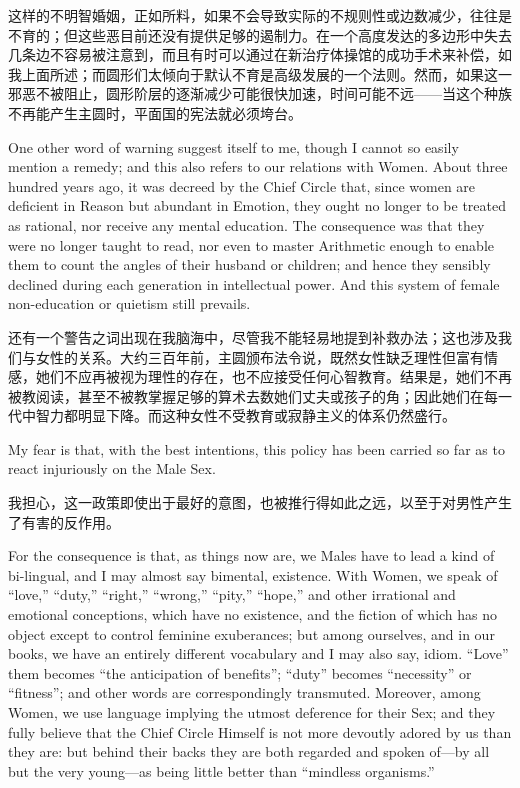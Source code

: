 \documentclass[12pt,UTF8]{ctexbook}
\begin{document}
这样的不明智婚姻，正如所料，如果不会导致实际的不规则性或边数减少，往往是不育的；但这些恶目前还没有提供足够的遏制力。在一个高度发达的多边形中失去几条边不容易被注意到，而且有时可以通过在新治疗体操馆的成功手术来补偿，如我上面所述；而圆形们太倾向于默认不育是高级发展的一个法则。然而，如果这一邪恶不被阻止，圆形阶层的逐渐减少可能很快加速，时间可能不远——当这个种族不再能产生主圆时，平面国的宪法就必须垮台。

One other word of warning suggest itself to me, though I cannot so easily mention a remedy; and this also refers to our relations with Women. About three hundred years ago, it was decreed by the Chief Circle that, since women are deficient in Reason but abundant in Emotion, they ought no longer to be treated as rational, nor receive any mental education. The consequence was that they were no longer taught to read, nor even to master Arithmetic enough to enable them to count the angles of their husband or children; and hence they sensibly declined during each generation in intellectual power. And this system of female non-education or quietism still prevails.

还有一个警告之词出现在我脑海中，尽管我不能轻易地提到补救办法；这也涉及我们与女性的关系。大约三百年前，主圆颁布法令说，既然女性缺乏理性但富有情感，她们不应再被视为理性的存在，也不应接受任何心智教育。结果是，她们不再被教阅读，甚至不被教掌握足够的算术去数她们丈夫或孩子的角；因此她们在每一代中智力都明显下降。而这种女性不受教育或寂静主义的体系仍然盛行。

My fear is that, with the best intentions, this policy has been carried so far as to react injuriously on the Male Sex.

我担心，这一政策即使出于最好的意图，也被推行得如此之远，以至于对男性产生了有害的反作用。

For the consequence is that, as things now are, we Males have to lead a kind of bi-lingual, and I may almost say bimental, existence. With Women, we speak of ``love,'' ``duty,'' ``right,'' ``wrong,'' ``pity,'' ``hope,'' and other irrational and emotional conceptions, which have no existence, and the fiction of which has no object except to control feminine exuberances; but among ourselves, and in our books, we have an entirely different vocabulary and I may also say, idiom. ``Love'' them becomes ``the anticipation of benefits''; ``duty'' becomes ``necessity'' or ``fitness''; and other words are correspondingly transmuted. Moreover, among Women, we use language implying the utmost deference for their Sex; and they fully believe that the Chief Circle Himself is not more devoutly adored by us than they are: but behind their backs they are both regarded and spoken of---by all but the very young—as being little better than ``mindless organisms.''
\end{document}
